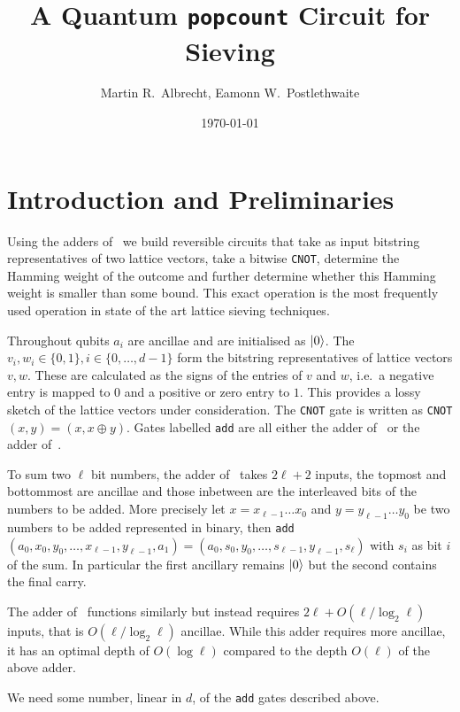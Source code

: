 \documentclass[notitlepage]{article}
\title{A Quantum \texttt{popcount} Circuit for Sieving}
\author{Martin R.~Albrecht, Eamonn W.~Postlethwaite}
\date{\today}
\theoremstyle{definition}
\begin{document}
\maketitle

\section*{Introduction and Preliminaries}

Using the adders of~\cite{cuccaro2004new,Takahashi:2008:FQC} we build reversible circuits that take as input bitstring representatives of two lattice vectors, take a bitwise \texttt{CNOT}, determine the Hamming weight of the outcome and further determine whether this Hamming weight is smaller than some bound.
This exact operation is the most frequently used operation in state of the art lattice sieving techniques.

Throughout qubits $a_{i}$ are ancillae and are initialised as $\ket{0}$.
The $v_{i}, w_{i} \in \{0, 1\}, i \in \{0, \dots, d - 1\}$ form the bitstring representatives of lattice vectors $v, w$.
These are calculated as the signs of the entries of $v$ and $w$, i.e.~a negative entry is mapped to $0$ and a positive or zero entry to $1$.
This provides a lossy sketch of the lattice vectors under consideration.
The \texttt{CNOT} gate is written as \texttt{CNOT}$(x, y) = (x, x \oplus y)$.
Gates labelled \texttt{add} are all either the adder of~\cite{cuccaro2004new} or the adder of~\cite{Takahashi:2008:FQC}.

To sum two $\ell$ bit numbers, the adder of~\cite{cuccaro2004new} takes $2\ell + 2$ inputs, the topmost and bottommost are ancillae and those inbetween are the interleaved bits of the numbers to be added.
More precisely let $x = x_{\ell-1}\dots x_{0}$ and $y = y_{\ell-1}\dots y_{0}$ be two numbers to be added represented in binary, then \texttt{add}$(a_{0}, x_{0}, y_{0}, \dots, x_{\ell-1}, y_{\ell-1}, a_{1}) = (a_{0}, s_{0}, y_{0}, \dots, s_{\ell-1}, y_{\ell-1}, s_{\ell})$ with $s_{i}$ as bit $i$ of the sum.
In particular the first ancillary remains $\ket{0}$ but the second contains the final carry.

The adder of~\cite{Takahashi:2008:FQC} functions similarly but instead requires $2\ell + O(\ell/\log_{2}\ell)$ inputs, that is $O(\ell/\log_{2}\ell)$ ancillae.
While this adder requires more ancillae, it has an optimal depth of $O(\log\ell)$ compared to the depth $O(\ell)$ of the above adder.

We need some number, linear in $d$, of the \texttt{add} gates described above.
\end{document}
